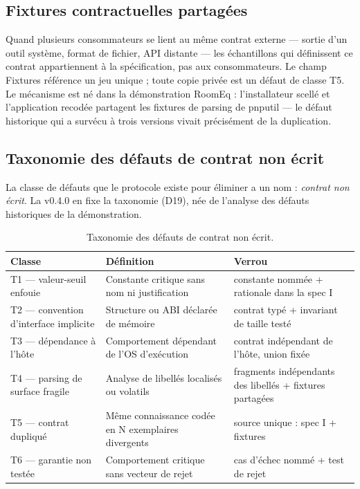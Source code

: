 \subsection{Fixtures contractuelles partagées}

Quand plusieurs consommateurs se lient au même contrat externe — sortie d’un outil
système, format de fichier, API distante — les échantillons qui définissent ce contrat
appartiennent à la spécification, pas aux consommateurs. Le champ Fixtures référence un
jeu unique ; toute copie privée est un défaut de classe T5. Le mécanisme est né dans la
démonstration RoomEq : l’installateur scellé et l’application recodée partagent les
fixtures de parsing de pnputil — le défaut historique qui a survécu à trois versions
vivait précisément de la duplication.

\subsection{Taxonomie des défauts de contrat non écrit}\label{sec:taxonomie}

La classe de défauts que le protocole existe pour éliminer a un nom : \emph{contrat non
écrit}. La v0.4.0 en fixe la taxonomie (D19), née de l’analyse des défauts historiques de
la démonstration.

\begin{table}[htbp]
\centering\small
\caption{Taxonomie des défauts de contrat non écrit.}
\label{tab:taxonomie}
\begin{tabularx}{\textwidth}{@{}l Y Y@{}}
\toprule
\textbf{Classe} & \textbf{Définition} & \textbf{Verrou} \\
\midrule
T1 — valeur-seuil enfouie & Constante critique sans nom ni justification & constante
nommée + rationale dans la spec I \\
T2 — convention d’interface implicite & Structure ou ABI déclarée de mémoire & contrat
typé + invariant de taille testé \\
T3 — dépendance à l’hôte & Comportement dépendant de l’OS d’exécution & contrat
indépendant de l’hôte, union fixée \\
T4 — parsing de surface fragile & Analyse de libellés localisés ou volatils & fragments
indépendants des libellés + fixtures partagées \\
T5 — contrat dupliqué & Même connaissance codée en N exemplaires divergents & source
unique : spec I + fixtures \\
T6 — garantie non testée & Comportement critique sans vecteur de rejet & cas d’échec
nommé + test de rejet \\
\bottomrule
\end{tabularx}
\end{table}

